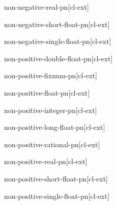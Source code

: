 \documentclass[10pt,english]{book}
\begin{document}
\begin{function}{non-negative-real-p}{n}[cl-ext]
  
\end{function}

\begin{function}{non-negative-short-float-p}{n}[cl-ext]
  
\end{function}

\begin{function}{non-negative-single-float-p}{n}[cl-ext]
  
\end{function}

\begin{function}{non-positive-double-float-p}{n}[cl-ext]
  
\end{function}

\begin{function}{non-positive-fixnum-p}{n}[cl-ext]
  
\end{function}

\begin{function}{non-positive-float-p}{n}[cl-ext]
  
\end{function}

\begin{function}{non-positive-integer-p}{n}[cl-ext]
  
\end{function}

\begin{function}{non-positive-long-float-p}{n}[cl-ext]
  
\end{function}

\begin{function}{non-positive-rational-p}{n}[cl-ext]
  
\end{function}

\begin{function}{non-positive-real-p}{n}[cl-ext]
  
\end{function}

\begin{function}{non-positive-short-float-p}{n}[cl-ext]
  
\end{function}

\begin{function}{non-positive-single-float-p}{n}[cl-ext]
  
\end{function}
\end{document}
